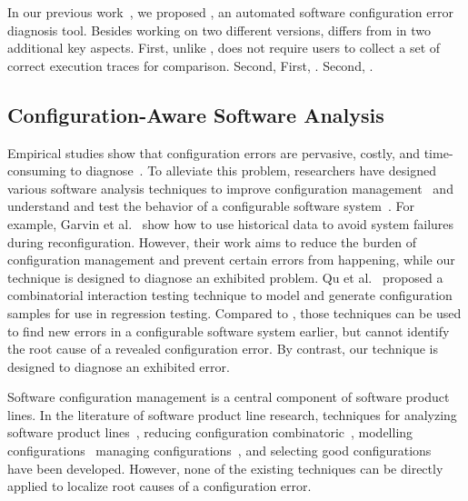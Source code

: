 In our previous work~\cite{}, we proposed \prevtool, an automated
software configuration error diagnosis tool. Besides working
on two different versions, \ourtool differs from \prevtool in
two additional key aspects. First, unlike \prevtool, \ourtool
does not require users to collect a set of correct execution traces
for comparison. Second, 
First, . Second, .




\subsection{Configuration-Aware Software Analysis}

Empirical studies show that configuration errors are pervasive, costly,
and time-consuming to diagnose~\cite{Yin:2011:ESC, Hubaux:2012}.
To alleviate this problem, researchers have designed various
software analysis techniques to improve configuration
management~\cite{Garvin:2011} and understand and test
the behavior of a configurable software
system~\cite{Garvin:2011, Qu:2008:CRT}.
For example, Garvin et al.~\cite{Garvin:2011} show how to
use historical data to avoid system failures during reconfiguration.
However, their work aims to reduce the burden of
configuration management and prevent certain errors from happening,
while our technique is designed to diagnose an exhibited problem.
Qu et al.~\cite{Qu:2008:CRT} proposed a combinatorial interaction
testing technique to model and generate configuration samples for
use in regression testing. Compared to \ourtool, those techniques
can be used to find new errors in
a configurable software system earlier, but cannot
identify the root cause of a revealed configuration error.
 By contrast, our technique is designed
to diagnose an exhibited error.

Software configuration management is a central component
of software product lines. In the literature of software
product line research, techniques for analyzing
software product lines~\cite{Bodden:2013:SLS, Kang:2005:FRL, Mende:2008:SGM, Kruger:2005:SAE}, reducing configuration
combinatoric~\cite{fse-splat, Apel:2009:FLA, Shang:2013:ADB, Staats:2011:PTO}, modelling
configurations~\cite{Denaro:Self-Test:TACOS:2003, Acher:2012:SCF}
managing configurations~\cite{Rabiser:2012:QSU, Cooray:2010:RRD, Barreiros:2009:MRC, TerBeek:2011:GCE},
and selecting good configurations~\cite{reconfig}
have been developed. However, none of the existing techniques
can be directly applied to localize root causes of a configuration error.
